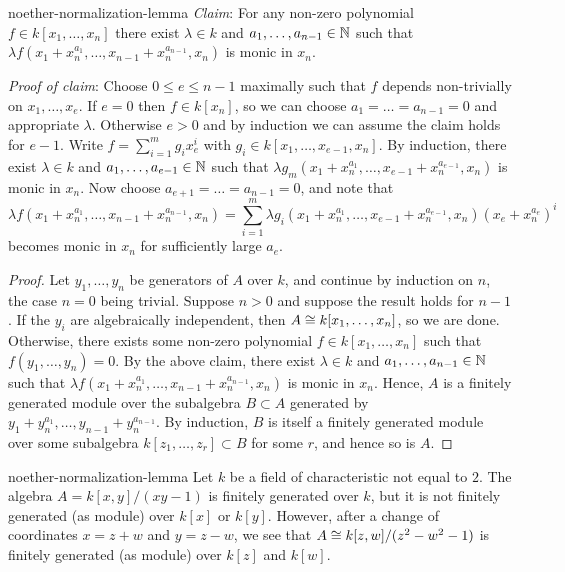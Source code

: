 \begin{example}{noether-normalization-lemma}
    \textit{Claim}: For any non-zero polynomial $f \in k[x_1, \ldots, x_n]$ there exist $\lambda \in k$ and $a_1, \ldots, a_{n - 1} \in \mathbb{N}$ such that $\lambda f(x_1 + x_n^{a_1}, \ldots, x_{n - 1} + x_n^{a_{n - 1}}, x_n)$ is monic in $x_n$.
    
    \textit{Proof of claim}: Choose $0 \le e \le n - 1$ maximally such that $f$ depends non-trivially on $x_1, \ldots, x_e$. If $e = 0$ then $f \in k[x_n]$, so we can choose $a_1 = \ldots = a_{n - 1} = 0$ and appropriate $\lambda$. Otherwise $e > 0$ and by induction we can assume the claim holds for $e - 1$. Write $f = \sum_{i = 1}^{m} g_i x_e^i$ with $g_i \in k[x_1, \ldots, x_{e - 1}, x_n]$. By induction, there exist $\lambda \in k$ and $a_1, \ldots, a_{e - 1} \in \mathbb{N}$ such that $\lambda g_m(x_1 + x_n^{a_1}, \ldots, x_{e - 1} + x_n^{a_{e - 1}}, x_n)$ is monic in $x_n$. Now choose $a_{e + 1} = \ldots = a_{n - 1} = 0$, and note that
        \[ \lambda f(x_1 + x_n^{a_1}, \ldots, x_{n - 1} + x_n^{a_{n - 1}}, x_n) = \sum_{i = 1}^{m} \lambda g_i(x_1 + x_n^{a_1}, \ldots, x_{e - 1} + x_n^{a_{e - 1}}, x_n) (x_e + x_n^{a_e})^i \]
        becomes monic in $x_n$ for sufficiently large $a_e$.

    \begin{proof}
        Let $y_1, \ldots, y_n$ be generators of $A$ over $k$, and continue by induction on $n$, the case $n = 0$ being trivial. Suppose $n > 0$ and suppose the result holds for $n - 1$. If the $y_i$ are algebraically independent, then $A \cong k[x_1, \ldots, x_n]$, so we are done. Otherwise, there exists some non-zero polynomial $f \in k[x_1, \ldots, x_n]$ such that $f(y_1, \ldots, y_n) = 0$. By the above claim, there exist $\lambda \in k$ and $a_1, \ldots, a_{n - 1} \in \mathbb{N}$ such that $\lambda f(x_1 + x_n^{a_1}, \ldots, x_{n - 1} + x_n^{a_{n - 1}}, x_n)$ is monic in $x_n$. Hence, $A$ is a finitely generated module over the subalgebra $B \subset A$ generated by $y_1 + y_n^{a_1}, \ldots, y_{n - 1} + y_n^{a_{n - 1}}$. By induction, $B$ is itself a finitely generated module over some subalgebra $k[z_1, \ldots, z_r] \subset B$ for some $r$, and hence so is $A$.
    \end{proof}
\end{example}

\begin{example}{noether-normalization-lemma}
    Let $k$ be a field of characteristic not equal to $2$. The algebra $A = k[x, y] / (xy - 1)$ is finitely generated over $k$, but it is not finitely generated (as module) over $k[x]$ or $k[y]$. However, after a change of coordinates $x = z + w$ and $y = z - w$, we see that $A \cong k[z, w] / (z^2 - w^2 - 1)$ is finitely generated (as module) over $k[z]$ and $k[w]$.
\end{example}

